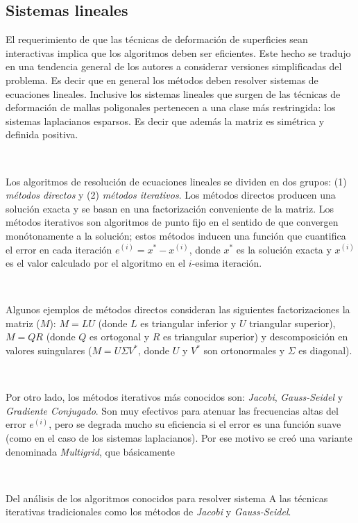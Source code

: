 \documentclass{article}
\begin{document}
\subsection{Sistemas lineales}
El requerimiento de que las técnicas de deformación de superficies sean 
interactivas implica que los algoritmos deben ser eficientes. Este hecho 
se tradujo en una tendencia general de los autores a considerar versiones 
simplificadas del problema. Es decir que en general los métodos deben resolver 
 sistemas de ecuaciones lineales. Inclusive los sistemas lineales que surgen 
de las técnicas de deformación de mallas poligonales pertenecen a una clase 
más restringida: los sistemas laplacianos esparsos. Es decir que además 
la matriz es simétrica y definida positiva.

\

Los algoritmos de resolución de ecuaciones lineales se dividen en dos grupos: 
(1) \emph{métodos directos} y (2) \emph{métodos iterativos}. Los métodos 
directos producen una solución exacta y se basan en una factorización conveniente 
de la matriz. Los métodos iterativos son algoritmos de punto fijo en 
el sentido de que convergen monótonamente a la solución; estos métodos 
inducen una función que cuantifica el error en cada iteración 
$e^{(i)} = x^* - x^{(i)}$, donde $x^*$ es la solución exacta y $x^{(i)}$ 
es el valor calculado por el algoritmo en el $i$-esima iteración.

\

Algunos ejemplos de métodos directos consideran las siguientes factorizaciones 
la  matriz ($M$): $M=LU$ (donde $L$ es triangular inferior y $U$ triangular 
superior), $M=QR$ (donde $Q$ es ortogonal y $R$ es triangular superior) y 
descomposición en valores suingulares ($M = U \Sigma V^*$, donde $U$ y $V^*$ 
son ortonormales y $\Sigma$ es diagonal).

\

Por otro lado, los métodos iterativos más conocidos son: \emph{Jacobi}, 
\emph{Gauss-Seidel} y \emph{Gradiente Conjugado}. Son muy efectivos para 
atenuar las frecuencias altas del error $e^{(i)}$, pero se degrada mucho 
su eficiencia si el error es una función suave (como en el caso de los sistemas 
laplacianos). Por ese motivo se creó una variante denominada \emph{Multigrid}, 
que básicamente

\

Del análisis de los algoritmos conocidos para resolver sistema \cite{K:2005} A las técnicas iterativas tradicionales 
como los métodos de \emph{Jacobi} y \emph{Gauss-Seidel}.
\end{document}
